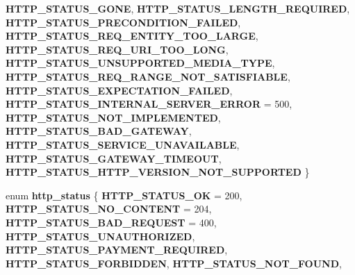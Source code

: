 \begin{DoxyCompactItemize}
{\bfseries H\+T\+T\+P\+\_\+\+S\+T\+A\+T\+U\+S\+\_\+\+G\+O\+NE}, 
{\bfseries H\+T\+T\+P\+\_\+\+S\+T\+A\+T\+U\+S\+\_\+\+L\+E\+N\+G\+T\+H\+\_\+\+R\+E\+Q\+U\+I\+R\+ED}, 
\newline
{\bfseries H\+T\+T\+P\+\_\+\+S\+T\+A\+T\+U\+S\+\_\+\+P\+R\+E\+C\+O\+N\+D\+I\+T\+I\+O\+N\+\_\+\+F\+A\+I\+L\+ED}, 
{\bfseries H\+T\+T\+P\+\_\+\+S\+T\+A\+T\+U\+S\+\_\+\+R\+E\+Q\+\_\+\+E\+N\+T\+I\+T\+Y\+\_\+\+T\+O\+O\+\_\+\+L\+A\+R\+GE}, 
{\bfseries H\+T\+T\+P\+\_\+\+S\+T\+A\+T\+U\+S\+\_\+\+R\+E\+Q\+\_\+\+U\+R\+I\+\_\+\+T\+O\+O\+\_\+\+L\+O\+NG}, 
{\bfseries H\+T\+T\+P\+\_\+\+S\+T\+A\+T\+U\+S\+\_\+\+U\+N\+S\+U\+P\+P\+O\+R\+T\+E\+D\+\_\+\+M\+E\+D\+I\+A\+\_\+\+T\+Y\+PE}, 
\newline
{\bfseries H\+T\+T\+P\+\_\+\+S\+T\+A\+T\+U\+S\+\_\+\+R\+E\+Q\+\_\+\+R\+A\+N\+G\+E\+\_\+\+N\+O\+T\+\_\+\+S\+A\+T\+I\+S\+F\+I\+A\+B\+LE}, 
{\bfseries H\+T\+T\+P\+\_\+\+S\+T\+A\+T\+U\+S\+\_\+\+E\+X\+P\+E\+C\+T\+A\+T\+I\+O\+N\+\_\+\+F\+A\+I\+L\+ED}, 
{\bfseries H\+T\+T\+P\+\_\+\+S\+T\+A\+T\+U\+S\+\_\+\+I\+N\+T\+E\+R\+N\+A\+L\+\_\+\+S\+E\+R\+V\+E\+R\+\_\+\+E\+R\+R\+OR} = 500, 
{\bfseries H\+T\+T\+P\+\_\+\+S\+T\+A\+T\+U\+S\+\_\+\+N\+O\+T\+\_\+\+I\+M\+P\+L\+E\+M\+E\+N\+T\+ED}, 
\newline
{\bfseries H\+T\+T\+P\+\_\+\+S\+T\+A\+T\+U\+S\+\_\+\+B\+A\+D\+\_\+\+G\+A\+T\+E\+W\+AY}, 
{\bfseries H\+T\+T\+P\+\_\+\+S\+T\+A\+T\+U\+S\+\_\+\+S\+E\+R\+V\+I\+C\+E\+\_\+\+U\+N\+A\+V\+A\+I\+L\+A\+B\+LE}, 
{\bfseries H\+T\+T\+P\+\_\+\+S\+T\+A\+T\+U\+S\+\_\+\+G\+A\+T\+E\+W\+A\+Y\+\_\+\+T\+I\+M\+E\+O\+UT}, 
{\bfseries H\+T\+T\+P\+\_\+\+S\+T\+A\+T\+U\+S\+\_\+\+H\+T\+T\+P\+\_\+\+V\+E\+R\+S\+I\+O\+N\+\_\+\+N\+O\+T\+\_\+\+S\+U\+P\+P\+O\+R\+T\+ED}
 \}
\item 
\mbox{\label{group__http_gabc3b93f68c8bdd857ad32913628dfa8d}} 
enum {\bfseries http\+\_\+status} \{ \newline
{\bfseries H\+T\+T\+P\+\_\+\+S\+T\+A\+T\+U\+S\+\_\+\+OK} = 200, 
{\bfseries H\+T\+T\+P\+\_\+\+S\+T\+A\+T\+U\+S\+\_\+\+N\+O\+\_\+\+C\+O\+N\+T\+E\+NT} = 204, 
{\bfseries H\+T\+T\+P\+\_\+\+S\+T\+A\+T\+U\+S\+\_\+\+B\+A\+D\+\_\+\+R\+E\+Q\+U\+E\+ST} = 400, 
{\bfseries H\+T\+T\+P\+\_\+\+S\+T\+A\+T\+U\+S\+\_\+\+U\+N\+A\+U\+T\+H\+O\+R\+I\+Z\+ED}, 
\newline
{\bfseries H\+T\+T\+P\+\_\+\+S\+T\+A\+T\+U\+S\+\_\+\+P\+A\+Y\+M\+E\+N\+T\+\_\+\+R\+E\+Q\+U\+I\+R\+ED}, 
{\bfseries H\+T\+T\+P\+\_\+\+S\+T\+A\+T\+U\+S\+\_\+\+F\+O\+R\+B\+I\+D\+D\+EN}, 
{\bfseries H\+T\+T\+P\+\_\+\+S\+T\+A\+T\+U\+S\+\_\+\+N\+O\+T\+\_\+\+F\+O\+U\+ND}, 

\end{DoxyCompactItemize}
